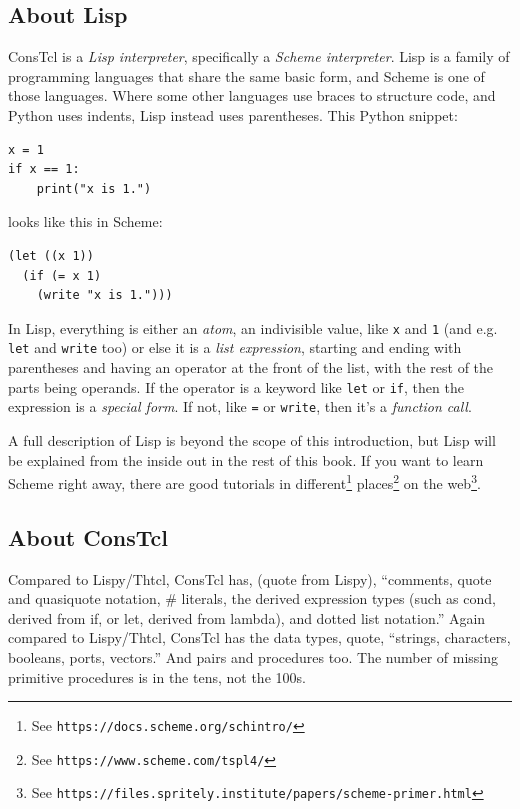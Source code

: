 \documentclass[a5paper,final]{memoir}
\begin{document}
\subsection{About Lisp}
\label{about-lisp}

ConsTcl is a \emph{Lisp interpreter}, specifically a \emph{Scheme interpreter}.
Lisp is a family of programming languages that share the same basic form, and
Scheme is one of those languages. Where some other languages use braces to
structure code, and Python uses indents, Lisp instead uses parentheses. This
Python snippet:

\begin{verbatim}
x = 1
if x == 1:
    print("x is 1.")
\end{verbatim}

\noindent looks like this in Scheme:

\begin{verbatim}
(let ((x 1))
  (if (= x 1)
    (write "x is 1.")))
\end{verbatim}

In Lisp, everything is either an \emph{atom}, an indivisible value, like
\texttt{x} and \texttt{1} (and e.g. \texttt{let} and \texttt{write} too) or
else it is a \emph{list expression}, starting and ending with parentheses and
having an operator at the front of the list, with the rest of the parts being
operands. If the operator is a keyword like \texttt{let} or \texttt{if}, then
the expression is a \emph{special form}. If not, like \texttt{=} or
\texttt{write}, then it's a \emph{function call}.

A full description of Lisp is beyond the scope of this introduction, but Lisp
will be explained from the inside out in the rest of this book. If you want to
learn Scheme right away, there are good tutorials in
different\footnote{See \texttt{https://docs.scheme.org/schintro/}}
places\footnote{See \texttt{https://www.scheme.com/tspl4/}} on the
web\footnote{See
\texttt{https://files.spritely.institute/papers/scheme-primer.html}}.

\subsection{About ConsTcl}
\label{about-constcl}

Compared to Lispy/Thtcl, ConsTcl has, (quote from Lispy), ``comments, quote and
quasiquote notation, \# literals, the derived expression types (such as cond,
derived from if, or let, derived from lambda), and dotted list notation.''
Again compared to Lispy/Thtcl, ConsTcl has the data types, quote, ``strings,
characters, booleans, ports, vectors.'' And pairs and procedures too. The
number of missing primitive procedures is in the tens, not the 100s. 
\end{document}
